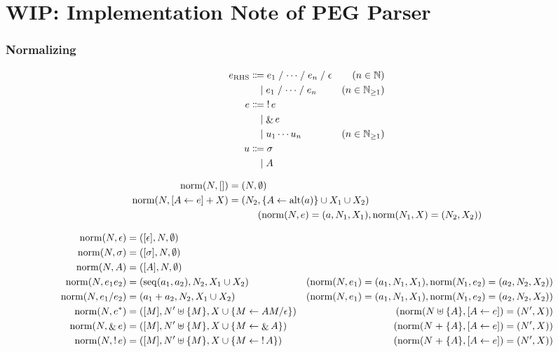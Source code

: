 \section{WIP: Implementation Note of PEG Parser}

\subsubsection{Normalizing}

\begin{align*}
  e_{\mathrm{RHS}}
  &\Coloneqq e_1 \mathrel{/} \cdots \mathrel{/} e_n \mathrel{/} \epsilon &(n \in \Natural) \\
  &\BNFor e_1 \mathrel{/} \cdots \mathrel{/} e_n &(n \in \Natural_{\geq 1}) \\
  e
  &\Coloneqq \mathop{!} e \\
  &\BNFor \mathop{\&} e \\
  &\BNFor u_1 \cdots u_n &(n \in \Natural_{\geq 1}) \\
  u
  &\Coloneqq \sigma \\
  &\BNFor A
\end{align*}

\begin{align*}
  \mathop{\mathrm{norm}}(N, []) &= (N, \emptyset) \\
  \mathop{\mathrm{norm}}(N, [A \gets e] + X) &= (N_2, \{A \gets \mathop{\mathrm{alt}}(a)\} \cup X_1 \cup X_2) \\
  &\hspace{3em}(\mathop{\mathrm{norm}}(N, e) = (a, N_1, X_1), \mathop{\mathrm{norm}}(N_1, X) = (N_2, X_2))
\end{align*}

\begin{align*}
  \mathop{\mathrm{norm}}(N, \epsilon) &= ([\epsilon], N, \emptyset) \\
  \mathop{\mathrm{norm}}(N, \sigma) &= ([\sigma], N, \emptyset) \\
  \mathop{\mathrm{norm}}(N, A) &= ([A], N, \emptyset) \\
  \mathop{\mathrm{norm}}(N, e_1 e_2) &= (\mathop{\mathrm{seq}}(a_1, a_2), N_2, X_1 \cup X_2) &(\mathop{\mathrm{norm}}(N, e_1) = (a_1, N_1, X_1), \mathop{\mathrm{norm}}(N_1, e_2) = (a_2, N_2, X_2)) \\
  \mathop{\mathrm{norm}}(N, e_1 / e_2) &= (a_1 + a_2, N_2, X_1 \cup X_2) &(\mathop{\mathrm{norm}}(N, e_1) = (a_1, N_1, X_1), \mathop{\mathrm{norm}}(N_1, e_2) = (a_2, N_2, X_2)) \\
  \mathop{\mathrm{norm}}(N, e^*) &= ([M], N' \uplus \{M\}, X \cup \{M \gets A M / \epsilon\}) &(\mathop{\mathrm{norm}}(N \uplus \{A\}, [A \gets e]) = (N', X)) \\
  \mathop{\mathrm{norm}}(N, \mathop{\&} e) &= ([M], N' \uplus \{M\}, X \cup \{M \gets \mathop{\&} A\}) &(\mathop{\mathrm{norm}}(N \mathrel{+} \{A\}, [A \gets e]) = (N', X)) \\
  \mathop{\mathrm{norm}}(N, \mathop{!} e) &= ([M], N' \uplus \{M\}, X \cup \{M \gets \mathop{!} A\}) &(\mathop{\mathrm{norm}}(N \mathrel{+} \{A\}, [A \gets e]) = (N', X))
\end{align*}

